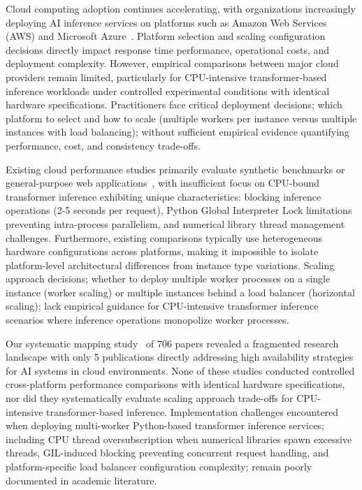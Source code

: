 Cloud computing adoption continues accelerating, with organizations increasingly deploying AI inference services on platforms such as Amazon Web Services (AWS) and Microsoft Azure~\cite{aws2023ha, azure2023ha}. Platform selection and scaling configuration decisions directly impact response time performance, operational costs, and deployment complexity. However, empirical comparisons between major cloud providers remain limited, particularly for CPU-intensive transformer-based inference workloads under controlled experimental conditions with identical hardware specifications. Practitioners face critical deployment decisions; which platform to select and how to scale (multiple workers per instance versus multiple instances with load balancing); without sufficient empirical evidence quantifying performance, cost, and consistency trade-offs.

Existing cloud performance studies primarily evaluate synthetic benchmarks or general-purpose web applications~\cite{li2013survey, chieu2010dynamic}, with insufficient focus on CPU-bound transformer inference exhibiting unique characteristics: blocking inference operations (2-5 seconds per request), Python Global Interpreter Lock limitations preventing intra-process parallelism, and numerical library thread management challenges. Furthermore, existing comparisons typically use heterogeneous hardware configurations across platforms, making it impossible to isolate platform-level architectural differences from instance type variations. Scaling approach decisions; whether to deploy multiple worker processes on a single instance (worker scaling) or multiple instances behind a load balancer (horizontal scaling); lack empirical guidance for CPU-intensive transformer inference scenarios where inference operations monopolize worker processes.

Our systematic mapping study~\cite{holandabilharinhodejesus2025high} of 706 papers revealed a fragmented research landscape with only 5 publications directly addressing high availability strategies for AI systems in cloud environments. None of these studies conducted controlled cross-platform performance comparisons with identical hardware specifications, nor did they systematically evaluate scaling approach trade-offs for CPU-intensive transformer-based inference. Implementation challenges encountered when deploying multi-worker Python-based transformer inference services; including CPU thread oversubscription when numerical libraries spawn excessive threads, GIL-induced blocking preventing concurrent request handling, and platform-specific load balancer configuration complexity; remain poorly documented in academic literature.

